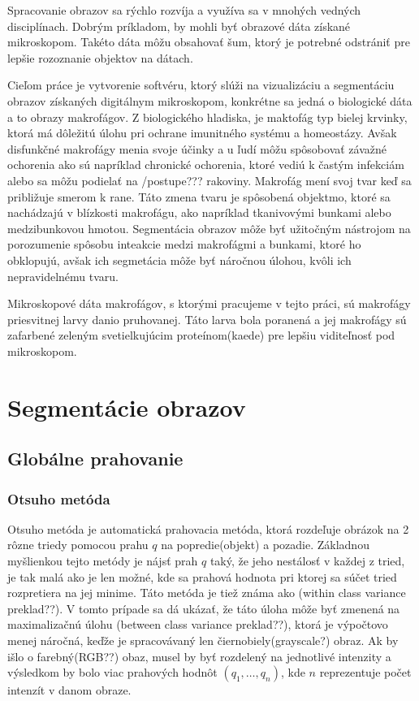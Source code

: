 \documentclass[a4paper,11pt,twoside]{article}%
\begin{document}
Spracovanie obrazov sa rýchlo rozvíja a využíva sa v mnohých vedných disciplínach. Dobrým príkladom, by mohli byť obrazové dáta získané mikroskopom. Takéto dáta môžu obsahovať šum, ktorý je potrebné odstrániť pre lepšie rozoznanie objektov na dátach.

Cieľom práce je vytvorenie softvéru, ktorý slúži na vizualizáciu a segmentáciu obrazov získaných digitálnym mikroskopom, konkrétne sa jedná o biologické dáta a to obrazy makrofágov. 
Z biologického hladiska, je maktofág typ bielej krvinky, ktorá má dôležitú úlohu pri ochrane imunitného systému a homeostázy. Avšak disfunkčné makrofágy menia svoje účinky a u ľudí môžu spôsobovať závažné ochorenia ako sú napríklad  chronické ochorenia, ktoré vediú k častým infekciám alebo sa môžu podielať na  /postupe??? rakoviny. Makrofág mení svoj tvar keď sa približuje smerom k rane. Táto zmena tvaru je spôsobená objektmo, ktoré sa nachádzajú v blízkosti makrofágu, ako napríklad tkanivovými bunkami alebo medzibunkovou hmotou.
Segmentácia obrazov môže byť užitočným nástrojom na porozumenie spôsobu inteakcie medzi makrofágmi a bunkami, ktoré ho obklopujú, avšak ich segmetácia môže byť náročnou úlohou, kvôli ich nepravidelnému tvaru.

Mikroskopové dáta makrofágov, s ktorými pracujeme v tejto práci, sú makrofágy priesvitnej larvy danio pruhovanej. Táto larva bola poranená a jej makrofágy sú zafarbené zeleným svetielkujúcim proteínom(kaede) pre lepšiu viditeľnosť pod mikroskopom.

\newpage

\section{Segmentácie obrazov}
\subsection{Globálne prahovanie}

\subsubsection{Otsuho metóda}
Otsuho metóda je automatická prahovacia metóda, ktorá rozdeľuje obrázok na 2 rôzne triedy pomocou prahu $q$ na popredie(objekt) a pozadie. Základnou myšlienkou tejto metódy je nájsť prah $q$ taký, že jeho nestálosť v každej z tried, je tak malá ako je len možné, kde sa prahová hodnota pri ktorej sa súčet tried rozpretiera na jej minime. Táto metóda je tiež známa ako (within class variance preklad??). V tomto prípade sa dá ukázať, že táto úloha môže byť zmenená na maximalizačnú úlohu (between class variance preklad??), ktorá je výpočtovo menej náročná, keďže je spracovávaný len čiernobiely(grayscale?) obraz. Ak by išlo o farebný(RGB??) obaz, musel by byť rozdelený na jednotlivé intenzity a výsledkom by bolo viac prahových hodnôt $(q_1, \ldots, q_n)$, kde $n$ reprezentuje počet intenzít v danom obraze.
\end{document}
